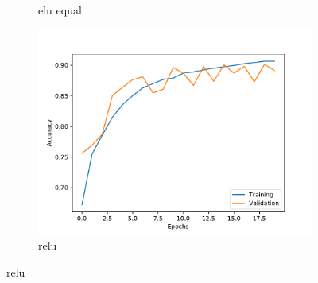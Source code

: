 \documentclass[aspectratio=1610, professionalfonts, 9pt]{beamer}
\begin{document}
\begin{frame}
\begin{figure}[H]
\begin{subfigure}{0.3\textwidth}
            \caption{elu equal}%
        \end{subfigure}%
        \hfill%
        \begin{subfigure}{0.3\textwidth}%
            \includegraphics[width=1.2\linewidth]{images/accuracy_history_relu.pdf}%
            \caption{relu}%
        \end{subfigure}%
    \end{figure}%
\end{frame}
\end{document}
